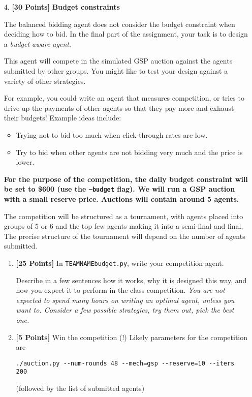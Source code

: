 \documentclass[11pt]{article}
\newcommand{\points}[1]{\textbf{[#1 Points]}}
\begin{document}
\begin{enumerate}
		\item[4.] \points{30} {\bf Budget constraints} 

                  The balanced bidding agent does not consider the
                  budget constraint when deciding how to bid.  In the
                  final part of the assignment, your task is to design
                  a {\em budget-aware agent}.

                  This agent will compete in the simulated GSP auction
                  against the agents submitted by other groups. You
                  might like to test your design against a variety of
                  other strategies.

                  For example, you could write an agent that measures
                  competition, or 
tries to drive up the payments of other
                  agents so that they pay more and exhaust their
budgets! Example ideas include:
%
\begin{itemize}
\item Trying not to bid too much when 
click-through rates are low.
%
\item Try to bid when other agents are not bidding very much
and the price is lower. 
%
\end{itemize}

{\bf For the purpose of the competition, the daily budget constraint
  will be set to \$600 (use the \texttt{--budget} flag). We will run a
  GSP auction with a small reserve price.  Auctions will contain
  around 5 agents.}

The competition will be structured as a tournament, with agents placed
into groups of 5 or 6 and the top few agents making it into a
semi-final and final. The precise structure of the tournament will
depend on the number of agents submitted.

		\begin{enumerate}
			\item \points{25} In \verb+TEAMNAMEbudget.py+, write your  competition agent. 

Describe in a few sentences how it works, why 
it is designed this way, 
and how you expect it to perform in the class competition.
		 {\em You are not expected to spend many hours on writing an optimal  agent, unless you want to. Consider a few possible strategies, try them out, pick the best one.}

			\item \points{5} Win the competition (!)
		Likely parameters for the competition are
		
		\verb+./auction.py --num-rounds 48 --mech=gsp --reserve=10 --iters 200+

(followed by the list of submitted agents)
		\end{enumerate}			
	\end{enumerate}
\end{document}
